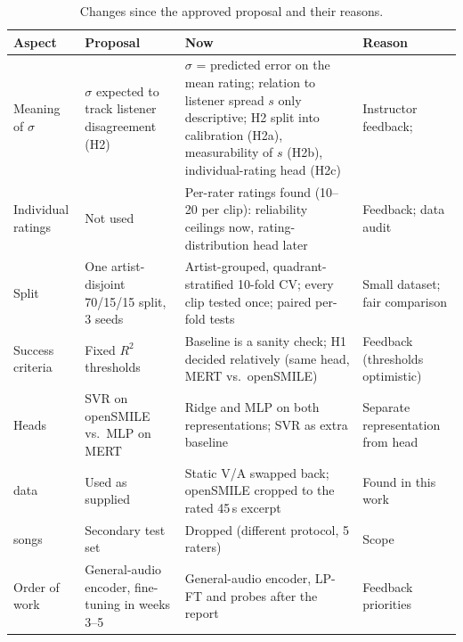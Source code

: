 \begin{table}[t]
\centering
\caption{Changes since the approved proposal and their reasons.}
\label{tab:deviations}
\footnotesize
\begin{tabularx}{\textwidth}{@{}>{\raggedright\arraybackslash}p{2.4cm}>{\raggedright\arraybackslash}p{4.3cm}>{\raggedright\arraybackslash}X>{\raggedright\arraybackslash}p{2.7cm}@{}}
\toprule
\textbf{Aspect} & \textbf{Proposal} & \textbf{Now} & \textbf{Reason} \\
\midrule
Meaning of $\sigma$ & $\sigma$ expected to track listener disagreement (H2) &
$\sigma$ = predicted error on the mean rating; relation to listener spread $s$ only descriptive; H2 split into calibration (H2a), measurability of $s$ (H2b), individual-rating head (H2c) &
Instructor feedback; \cite{watcharasupat2025} \\
Individual ratings & Not used & Per-rater ratings found (10--20 per clip): reliability ceilings now, rating-distribution head later & Feedback; data audit \\
Split & One artist-disjoint 70/15/15 split, 3 seeds & Artist-grouped, quadrant-stratified 10-fold CV; every clip tested once; paired per-fold tests & Small dataset; fair comparison \\
Success criteria & Fixed $R^2$ thresholds & Baseline is a sanity check; H1 decided relatively (same head, MERT vs.\ openSMILE) & Feedback (thresholds optimistic) \\
Heads & SVR on openSMILE vs.\ MLP on MERT & Ridge and MLP on both representations; SVR as extra baseline & Separate representation from head \\
2013 data & Used as supplied & Static V/A swapped back; openSMILE cropped to the rated 45\,s excerpt & Found in this work \\
2015 songs & Secondary test set & Dropped (different protocol, 5 raters) & Scope \\
Order of work & General-audio encoder, fine-tuning in weeks 3--5 & General-audio encoder, LP-FT and probes after the report & Feedback priorities \\
\bottomrule
\end{tabularx}
\end{table}
